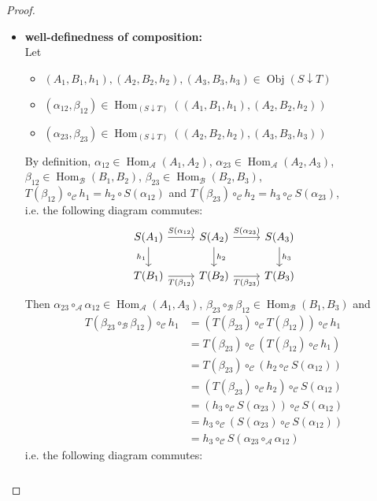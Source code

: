 \documentclass[12pt]{amsart}
\theoremstyle{definition}
\newcommand{\al}{\alpha}
\newcommand{\be}{\beta}
\newcommand{\MA}{\mathcal{A}}
\newcommand{\MB}{\mathcal{B}}
\newcommand{\MC}{\mathcal{C}}
\DeclareMathOperator{\Obj}{Obj}
\DeclareMathOperator{\Hom}{Hom}
\DeclareMathOperator*{\0}{\mbf{0}}
\DeclareMathOperator*{\1}{\mbf{1}}
\begin{document}
	\begin{proof}\
		\begin{itemize}
			\item \textbf{well-definedness of composition:} \\
			Let 
			\begin{itemize}
				\item $(A_1, B_1, h_1), (A_2, B_2, h_2), (A_3, B_3, h_3) \in \Obj(S \downarrow T)$
				\item $(\al_{12}, \be_{12}) \in \Hom_{(S \downarrow T)}((A_1, B_1, h_1), (A_2, B_2, h_2))$ 
				\item $(\al_{23}, \be_{23}) \in \Hom_{(S \downarrow T)}((A_2, B_2, h_2), (A_3, B_3, h_3))$
			\end{itemize}
			By definition, $\al_{12} \in \Hom_{\MA}(A_1, A_2)$, $\al_{23} \in \Hom_{\MA}(A_2, A_3)$, $\be_{12} \in \Hom_{\MB}(B_1, B_2)$, $\be_{23} \in \Hom_{\MB}(B_2, B_3)$, $T(\be_{12}) \circ_{\MC} h_1 = h_2 \circ S(\al_{12})$ and $T(\be_{23}) \circ_{\MC} h_2 = h_3 \circ_{\MC} S(\al_{23})$, \\
			i.e. the following diagram commutes:
			\[ 
			\begin{tikzcd}
				S(A_1) \arrow[r, "S(\al_{12})"] \arrow[d, "h_1"'] & S(A_2)  \arrow[d, "h_2"] \arrow[r, "S(\al_{23})"] 
				& S(A_3) \arrow[d, "h_3"]\\
				T(B_1) \arrow[r, "T(\be_{12})"']                  & T(B_2)                   \arrow[r, "T(\be_{23})"'] 
				& T(B_3) 
			\end{tikzcd}
			\]
			Then $\al_{23} \circ_{\MA} \al_{12} \in \Hom_{\MA}(A_1, A_3)$, $\be_{23} \circ_{\MB} \be_{12} \in \Hom_{\MB}(B_1, B_3)$ and 
			\begin{align*}
				T(\be_{23} \circ_{\MB} \be_{12}) \circ_{\MC} h_1
				& = (T(\be_{23}) \circ_{\MC} T(\be_{12})) \circ_{\MC} h_1 \\
				& = T(\be_{23}) \circ_{\MC} (T(\be_{12}) \circ_{\MC} h_1) \\
				& = T(\be_{23}) \circ_{\MC} (h_2 \circ_{\MC} S(\al_{12})) \\
				& = (T(\be_{23}) \circ_{\MC} h_2) \circ_{\MC} S(\al_{12}) \\
				& = (h_3 \circ_{\MC} S(\al_{23})) \circ_{\MC} S(\al_{12}) \\
				& = h_3 \circ_{\MC} (S(\al_{23}) \circ_{\MC} S(\al_{12})) \\
				& = h_3 \circ_{\MC} S(\al_{23} \circ_{\MA} \al_{12})
			\end{align*}
			i.e. the following diagram commutes:
			\[ 
			\begin{tikzcd}

\end{tikzcd}\]
\end{itemize}
\end{proof}
\end{document}

